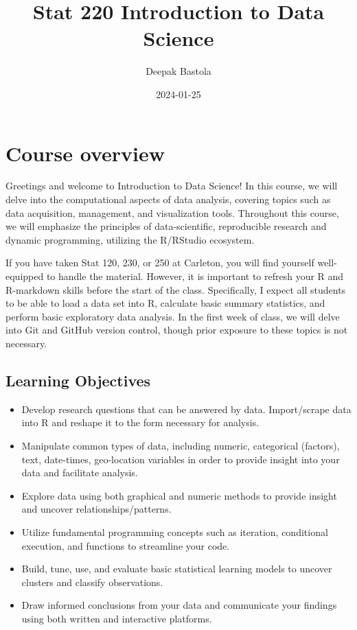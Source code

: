 \documentclass[
]{book}
\title{Stat 220 Introduction to Data Science}
\author{Deepak Bastola}
\date{2024-01-25}
\providecommand{\tightlist}{%
  \setlength{\itemsep}{0pt}\setlength{\parskip}{0pt}}
\begin{document}
\maketitle

{
\setcounter{tocdepth}{1}
\tableofcontents
}
\hypertarget{course-overview}{%
\chapter*{Course overview}\label{course-overview}}

Greetings and welcome to Introduction to Data Science! In this course, we will delve into the computational aspects of data analysis, covering topics such as data acquisition, management, and visualization tools. Throughout this course, we will emphasize the principles of data-scientific, reproducible research and dynamic programming, utilizing the R/RStudio ecosystem.

If you have taken Stat 120, 230, or 250 at Carleton, you will find yourself well-equipped to handle the material. However, it is important to refresh your R and R-markdown skills before the start of the class. Specifically, I expect all students to be able to load a data set into R, calculate basic summary statistics, and perform basic exploratory data analysis. In the first week of class, we will delve into Git and GitHub version control, though prior exposure to these topics is not necessary.

\hypertarget{learning-objectives}{%
\section{Learning Objectives}\label{learning-objectives}}

\begin{itemize}
\tightlist
\item
  Develop research questions that can be answered by data. Import/scrape data into R and reshape it to the form necessary for analysis.
\item
  Manipulate common types of data, including numeric, categorical (factors), text, date-times, geo-location variables in order to provide insight into your data and facilitate analysis.
\item
  Explore data using both graphical and numeric methods to provide insight and uncover relationships/patterns.
\item
  Utilize fundamental programming concepts such as iteration, conditional execution, and functions to streamline your code.
\item
  Build, tune, use, and evaluate basic statistical learning models to uncover clusters and classify observations.
\item
  Draw informed conclusions from your data and communicate your findings using both written and interactive platforms.
\end{itemize}
\end{document}
